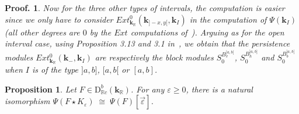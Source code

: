 \documentclass[a4paper, english, 11pt]{article}
\newcommand{\kk}[0]{\textbf{k}}
\newcommand{\0}{\vec{0}}
\newcommand{\R}[0]{\mathbb{R}}
\newcommand{\D}[0]{\text{D}}
\newtheorem{prop}{Proposition}[section]
\newtheorem*{pf}{Proof.} }
\begin{document}
\begin{pf}
\smallskip

Now for the three other types of intervals, the computation is easier since we only have to consider $Ext^0_{\kk_\R}\left( \kk_{]-x,y[}, \kk_{I }\right)$ in the computation of $\Psi(\kk_I)$ (all other degrees are $0$ by the $Ext$ computations of~\cite{Berk18}). Arguing as for the open interval case, using Proposition 3.13 and 3.1 in~\cite{Berk18}, we obtain  that the persistence modules $Ext^0_{\kk_\R}\left( \kk_{-}, \kk_{I }\right)$ are respectively the block modules $S_0^{B_v^{[a,b[}}$, $S_0^{B_h^{]a,b]}}$ and 
$S_0^{B_b^{]a,b[}}$ when $I$ is of the type $]a, b]$, $[a, b[$ or $[a,b]$. 
\end{pf}

\begin{prop}\label{P:Psipreservesinterl}Let $F \in \D^b_{\R c}(\kk_\R)$. For any $\varepsilon \geq 0$, there is a natural isomorphism 
$ \Psi(F \star K_{\varepsilon}) \; \cong \; \Psi(F)[\vec{\varepsilon}]$.
\end{prop}
\end{document}
